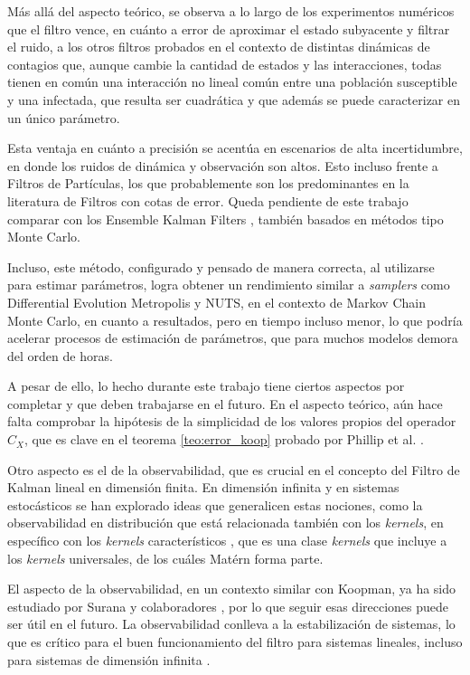 Más allá del aspecto teórico, se observa a lo largo de los experimentos numéricos que el filtro vence, en cuánto a error de aproximar el estado subyacente y filtrar el ruido, a los otros filtros probados en el contexto de distintas dinámicas de contagios que, aunque cambie la cantidad de estados y las interacciones, todas tienen en común una interacción no lineal común entre una población susceptible y una infectada, que resulta ser cuadrática y que además se puede caracterizar en un único parámetro.

Esta ventaja en cuánto a precisión se acentúa en escenarios de alta incertidumbre, en donde los ruidos de dinámica y observación son altos. Esto incluso frente a Filtros de Partículas, los que probablemente son los predominantes en la literatura de Filtros con cotas de error. Queda pendiente de este trabajo comparar con los Ensemble Kalman Filters \cite{Evensen1994SequentialStatistics}, también basados en métodos tipo Monte Carlo.

Incluso, este método, configurado y pensado de manera correcta, al utilizarse para estimar parámetros, logra obtener un rendimiento similar a \textit{samplers} como Differential Evolution Metropolis y NUTS, en el contexto de Markov Chain Monte Carlo, en cuanto a resultados, pero en tiempo incluso menor, lo que podría acelerar procesos de estimación de parámetros, que para muchos modelos demora del orden de horas.

A pesar de ello, lo hecho durante este trabajo tiene ciertos aspectos por completar y que deben trabajarse en el futuro. En el aspecto teórico, aún hace falta comprobar la hipótesis de la simplicidad de los valores propios del operador $C_X$, que es clave en el teorema \ref{teo:error_koop} probado por Phillip et al. \cite{Philipp2024ErrorOperator}. 

Otro aspecto es el de la observabilidad, que es crucial en el concepto del Filtro de Kalman lineal en dimensión finita. En dimensión infinita y en sistemas estocásticos se han explorado ideas que generalicen estas nociones, como la observabilidad en distribución \cite{Massiani2024Data-DrivenSystems} que está relacionada también con los \textit{kernels}, en específico con los \textit{kernels} característicos \cite{Sriperumbudur2010OnMeasures, Sriperumbudur2011UniversalityMeasures}, que es una clase \textit{kernels} que incluye a los \textit{kernels} universales, de los cuáles Matérn forma parte.

El aspecto de la observabilidad, en un contexto similar con Koopman, ya ha sido estudiado por Surana y colaboradores \cite{Surana2016LinearFramework}, por lo que seguir esas direcciones puede ser útil en el futuro. La observabilidad conlleva a la estabilización de sistemas, lo que es crítico para el buen funcionamiento del filtro para sistemas lineales, incluso para sistemas de dimensión infinita \cite{Afshar2024ExtendedSystems}.

